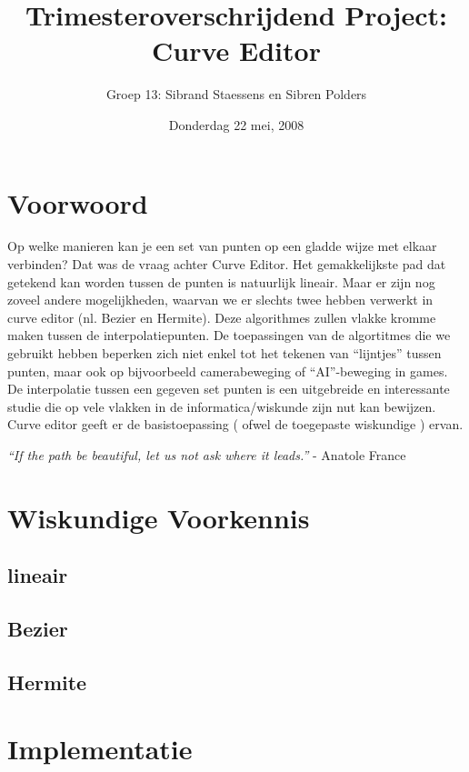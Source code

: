 \documentclass[a4paper,11pt,oneside, titlepage]{article}
\author{Groep 13: Sibrand Staessens en Sibren Polders}
\title{Trimesteroverschrijdend Project: Curve Editor}
\date{Donderdag 22 mei, 2008}
\begin{document}
\maketitle \newpage
\tableofcontents \newpage
\section{Voorwoord}
Op welke manieren kan je een set van punten op een gladde wijze met elkaar verbinden? Dat was
de vraag achter Curve Editor. Het gemakkelijkste pad dat getekend kan worden tussen de punten
is natuurlijk lineair. Maar er zijn nog zoveel andere mogelijkheden, waarvan we er
slechts twee hebben verwerkt in curve editor (nl. Bezier en Hermite). Deze algorithmes zullen
vlakke kromme maken tussen de interpolatiepunten. De toepassingen van de algortitmes die we 
gebruikt hebben beperken zich niet enkel tot het tekenen van ``lijntjes'' tussen punten, 
maar ook op bijvoorbeeld camerabeweging of ``AI''-beweging in games.
De interpolatie tussen een gegeven set punten is een uitgebreide en interessante studie die 
op vele vlakken in de informatica/wiskunde zijn nut kan bewijzen. Curve editor geeft er de 
basistoepassing ( ofwel de toegepaste wiskundige ) ervan. \newline \newline \newline \newline
\newline \newline \newline \newline
\begin{center}
\textit{``If the path be beautiful, let us not ask where it leads.''} - Anatole France \newpage
\end{center}\newpage
\section{Wiskundige Voorkennis}
\subsection{lineair}
\subsection{Bezier}
\subsection{Hermite}
\newpage
\section{Implementatie}
\end{document}
